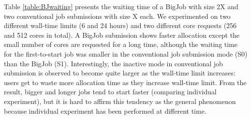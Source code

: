 \documentclass[preprint,12pt]{elsarticle}
\begin{document}
Table \ref{table:BJwaiting} presents the waiting time of a BigJob with size 2X and 
two conventional job submissions with size X each. We experimented on two different 
wall-time limits (6 and 24 hours) and two different core requests 
(256 and 512 cores in total). A BigJob submission shows faster allocation 
except the small number of cores are requested for a long time,
although the waiting time for the first-to-start job was smaller 
in the conventional job submission mode (S0) than the BigJob (S1).
Interestingly, the inactive mode in conventional job submission
is observed to become quite larger as the wall-time limit increases:
users get to waste more allocation time as they increase wall-time limit.
From the result, bigger and longer jobs tend to start faster (comparing
individual experiment), but it is hard to affirm this tendency as the
general phenomenon because individual experiment has been performed at different time.
\end{document}
